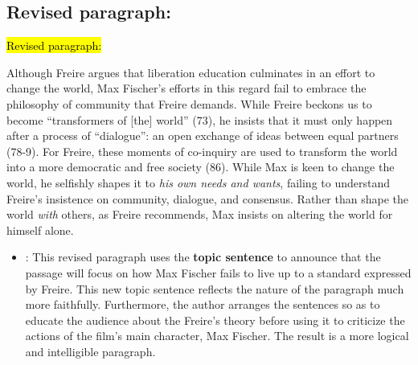 \subsection*{Revised paragraph:}

\bigskip

\begin{tcolorbox}[enhanced,width=4.2in,left=.3in, right=.3in,
   drop fuzzy shadow southeast,
    boxrule=0.4pt,sharp corners,colframe=black!80!black,colback=white!10]

\medskip

{\small
\begin{doublespacing}

\hl{Revised paragraph:}\medskip

\hspace{.5cm}Although Freire argues that liberation education culminates in an effort to change the world, Max Fischer's efforts in this regard fail to embrace the philosophy of community that Freire demands. While Freire beckons us to become “transformers of [the] world” (73), he insists that it must only happen after a process of “dialogue”: an open exchange of ideas between equal partners (78-9). For Freire, these moments of co-inquiry are used to transform the world into a more democratic and free society (86). While Max is keen to change the world, he selfishly shapes it to \emph{his own needs and wants}, failing to understand Freire's insistence on community, dialogue, and consensus. Rather than shape the world \emph{with} others, as Freire recommends, Max insists on altering the world for himself alone.

\medskip

\end{doublespacing}}

\end{tcolorbox}

\begin{itemize}
\item {}: This revised paragraph uses the \textbf{topic sentence} to announce that the passage will focus on how Max Fischer fails to live up to a standard expressed by Freire. This new topic sentence reflects the nature of the paragraph much more faithfully. Furthermore, the author arranges the sentences so as to educate the audience about the Freire's theory before using it to criticize the actions of the film's main character, Max Fischer. The result is a more logical and intelligible paragraph.
\end{itemize}
